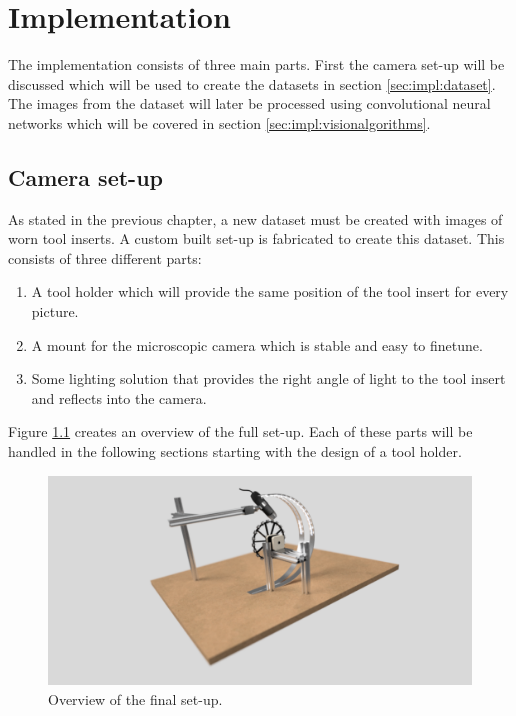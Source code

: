  
\chapter{Implementation}
\label{chap:impl}

The implementation consists of three main parts. First the camera set-up will be discussed which will be used to create the datasets in section \ref{sec:impl:dataset}. The images from the dataset will later be processed using convolutional neural networks which will be covered in section \ref{sec:impl:visionalgorithms}.

\section{Camera set-up}
\label{sec:impl:camerasetup}
As stated in the previous chapter, a new dataset must be created with images of worn tool inserts. A custom built set-up is fabricated to create this dataset. This consists of three different parts:
\begin{enumerate}
\item A tool holder which will provide the same position of the tool insert for every picture.
\item A mount for the microscopic camera which is stable and easy to finetune.
\item Some lighting solution that provides the right angle of light to the tool insert and reflects into the camera.
\end{enumerate}

Figure \ref{fig:impl:setup:overview} creates an overview of the full set-up. Each of these parts will be handled in the following sections starting with the design of a tool holder.
	
	\begin{figure}[hbtp]
		\centering
		\includegraphics[width=\textwidth]{fig/Camera_setup/model/render/Full setup v12 right back.png}
		\caption{Overview of the final set-up.}
		\label{fig:impl:setup:overview}
	\end{figure}
	
